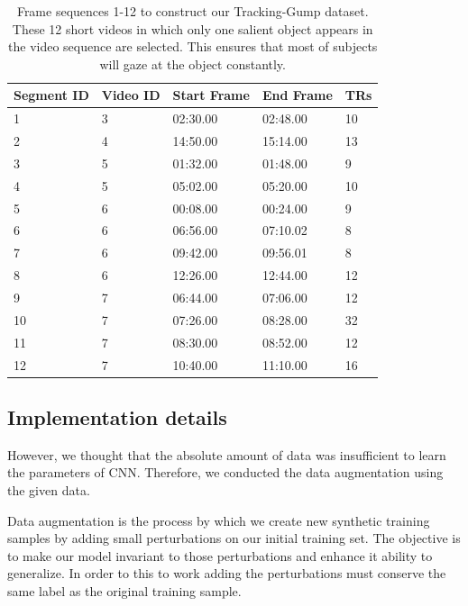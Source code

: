 \documentclass[sn-mathphys]{sn-jnl}%
\theoremstyle{thmstyleone}%
\theoremstyle{thmstyletwo}%
\theoremstyle{thmstylethree}%
\begin{document}
\begin{table}[h]
	\centering
	\footnotesize
	\caption{Frame sequences 1-12 to construct our Tracking-Gump dataset.
		These 12 short videos in which only one salient object appears in the video sequence are selected. 
		This ensures that most of subjects will gaze at the object constantly.}
	
	\label{tab:track_seg}
	
	\begin{tabular}{p{1.0cm}<{\centering}p{0.9cm}<{\centering}p{1.6cm}<{\centering}p{1.5cm}<{\centering}p{0.7cm}<{\centering}}
		\toprule[1.5pt]
		Segment ID & Video ID  & Start Frame    & End Frame  & TRs   \\ \midrule[1pt]
		1     		  & 3 			   & 02:30.00 	   & 02:48.00  & 10  		  \\
		2  	 		  & 4 			   & 14:50.00 	   & 15:14.00  & 13   		  \\
		3   		  & 5 			   & 01:32.00 	   & 01:48.00  & 9   		  \\
		4   		  & 5 			   & 05:02.00  	   & 05:20.00  & 10   		  \\
		5   		  & 6 			   & 00:08.00 	   & 00:24.00  & 9   		  \\
		6   		  & 6 			   & 06:56.00 	   & 07:10.02  & 8   		  \\
		7   		  & 6 			   & 09:42.00  	   & 09:56.01  & 8   		  \\
		8   		  & 6 			   & 12:26.00 	   & 12:44.00  & 12		      \\
		9   		  & 7  			   & 06:44.00 	   & 07:06.00  & 12		      \\
		10  		  & 7 			   & 07:26.00 	   & 08:28.00  & 32		      \\
		11  		  & 7 			   & 08:30.00 	   & 08:52.00  & 12		      \\
		12 			  & 7 			   & 10:40.00 	   & 11:10.00  & 16		      \\
		\bottomrule[1.5pt]
	\end{tabular}
	
\end{table}


\subsection{Implementation details}
However, we thought that the absolute amount of data was insufficient to learn the parameters of CNN.
Therefore, we conducted the data augmentation using the given data.


Data augmentation is the process by which we create new synthetic training samples by adding small perturbations on our initial training set.
The objective is to make our model invariant to those perturbations and enhance it ability to generalize.
In order to this to work adding the perturbations must conserve the same label as the original training sample.
\end{document}
